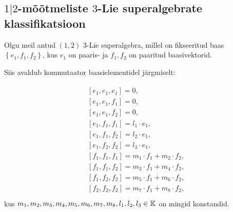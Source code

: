 
\subsection{\texorpdfstring{$1|2$}{1|2}-mõõtmeliste
    \texorpdfstring{$3$}{3}-Lie superalgebrate klassifikatsioon}

Olgu meil antud $(1, 2)$ 3-Lie superalgebra, millel on fikseeritud baas
$\left\{ e_1, f_1, f_2 \right\}$, kus $e_1$ on paaris- ja
$f_1, f_2$ on paaritud baasivektorid.

Siis avaldub kommutaator baasielementidel järgmiselt:

\begin{align}\label{samasused:1-2}
    \begin{split}
        & \left[ e_1, e_1, e_1 \right] = 0, \\
        & \left[ e_1, e_1, f_1 \right] = 0, \\
        & \left[ e_1, e_1, f_2 \right] = 0, \\
        & \left[ e_1, f_1, f_1 \right] = l_1 \cdot e_1, \\
        & \left[ e_1, f_1, f_2 \right] = l_2 \cdot e_1, \\
        & \left[ e_1, f_2, f_2 \right] = l_3 \cdot e_1, \\
        & \left[ f_1, f_1, f_1 \right] = m_1 \cdot f_1 + m_2 \cdot f_2, \\
        & \left[ f_1, f_1, f_2 \right] = m_3 \cdot f_1 + m_4 \cdot f_2, \\
        & \left[ f_1, f_2, f_2 \right] = m_5 \cdot f_1 + m_6 \cdot f_2, \\
        & \left[ f_2, f_2, f_2 \right] = m_7 \cdot f_1 + m_8 \cdot f_2, \\
    \end{split}
\end{align}
kus $m_1, m_2, m_3, m_4, m_5, m_6, m_7, m_8, l_1, l_2, l_3 \in \mathbb{K}$
on mingid konstandid.


